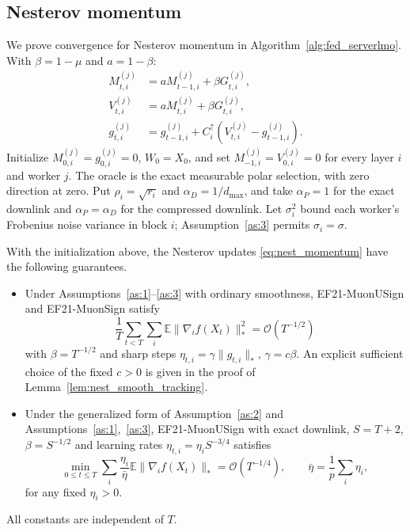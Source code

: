 \begin{codex}
\subsection{Nesterov momentum}\label{app:nesterov_conv}

We prove convergence for Nesterov momentum in
Algorithm~\ref{alg:fed_serverlmo}. With
$\beta=1-\mu$ and $a=1-\beta$:
\begin{align}
 M_{t,i}^{(j)}&=aM_{t-1,i}^{(j)}+\beta G_{t,i}^{(j)},\nonumber\\
 V_{t,i}^{(j)}&=aM_{t,i}^{(j)}+\beta G_{t,i}^{(j)},\label{eq:nest_momentum}\\
 g_{t,i}^{(j)}&=g_{t-1,i}^{(j)}+
 C_i^\uparrow(V_{t,i}^{(j)}-g_{t-1,i}^{(j)}).\nonumber
\end{align}
Initialize $M_{0,i}^{(j)}=g_{0,i}^{(j)}=0$, $W_0=X_0$, and set
$M_{-1,i}^{(j)}=V_{0,i}^{(j)}=0$ for every layer $i$ and worker $j$.
The oracle is the exact measurable polar
selection, with zero direction at zero. Put $\rho_i=\sqrt{r_i}$ and
$\alpha_D=1/d_{\max}$, and take $\alpha_P=1$ for the exact downlink and
$\alpha_P=\alpha_D$ for the compressed downlink.
Let $\sigma_i^2$ bound each worker's Frobenius noise variance in block $i$;
Assumption~\ref{as:3} permits $\sigma_i=\sigma$.

\begin{theorem}\label{thm:nesterov_conv}
With the initialization above, the Nesterov updates
\eqref{eq:nest_momentum} have the following guarantees.
\begin{itemize}
\item[\emph{(i)}] Under Assumptions~\ref{as:1}--\ref{as:3} with ordinary
smoothness, EF21-MuonUSign and EF21-MuonSign satisfy
\[
 \frac1T\sum_{t<T}\sum_i\mathbb E\|\nabla_i f(X_t)\|_*^2
 =\mathcal O(T^{-1/2})
\]
with $\beta=T^{-1/2}$ and sharp steps
$\eta_{t,i}=\gamma\|g_{t,i}\|_*$, $\gamma=c\beta$.
An explicit sufficient choice of the fixed $c>0$ is given in the proof of
Lemma~\ref{lem:nest_smooth_tracking}.
\item[\emph{(ii)}] Under the generalized form of Assumption~\ref{as:2} and
Assumptions~\ref{as:1},~\ref{as:3}, EF21-MuonUSign with exact downlink,
$S=T+2$, $\beta=S^{-1/2}$ and learning rates
$\eta_{t,i}=\eta_i S^{-3/4}$ satisfies
\[
 \min_{0\le t\le T}\sum_i\frac{\eta_i}{\bar\eta}
       \mathbb E\|\nabla_i f(X_t)\|_*
 =\mathcal O(T^{-1/4}),\qquad
 \bar\eta=\frac1p\sum_i\eta_i,
\]
for any fixed $\eta_i>0$.
\end{itemize}
All constants are independent of $T$.
\end{theorem}


\end{codex}
